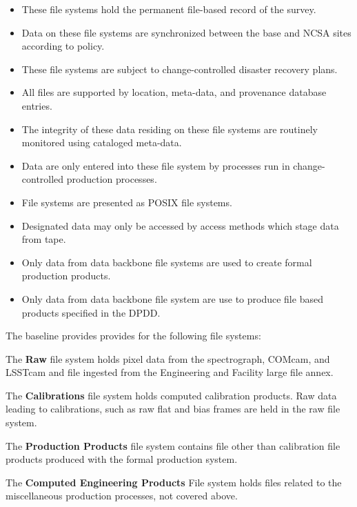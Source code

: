 \documentclass[toc,DM,lsstdraft]{lsstdoc}
\begin{document}
\begin{itemize}
\item
  These file systems hold the permanent file-based record of the survey.
\item
  Data on these file systems are synchronized between the base and NCSA
  sites according to policy.
\item
  These file systems are subject to change-controlled disaster recovery
  plans.
\item
  All files are supported by location, meta-data, and provenance
  database entries.
\item
  The integrity of these data residing on these file systems are
  routinely monitored using cataloged meta-data.
\item
  Data are only entered into these file system by processes run in
  change-controlled production processes.
\item
  File systems are presented as POSIX file systems.
\item
  Designated data may only be accessed by access methods which stage
  data from tape.
\item
  Only data from data backbone file systems are used to create formal
  production products.
\item
  Only data from data backbone file system are use to produce file based
  products specified in the DPDD.
\end{itemize}

The baseline provides provides for the following file systems:

The \textbf{Raw} file system holds pixel data from the spectrograph,
COMcam, and LSSTcam and file ingested from the Engineering and Facility
large file annex.

The \textbf{Calibrations} file system holds computed calibration
products. Raw data leading to calibrations, such as raw flat and bias
frames are held in the raw file system.

The \textbf{Production Products} file system contains file other than
calibration file products produced with the formal production system.

The \textbf{Computed Engineering Products} File system holds files
related to the miscellaneous production processes, not covered above.
\end{document}
